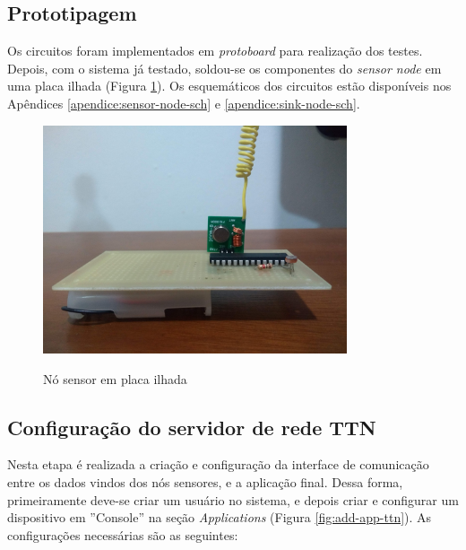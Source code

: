 \documentclass[oneside,openright,12pt]{ufsm_2015} %
\begin{document}
    \subsection{Prototipagem}
    Os circuitos foram implementados em \textit{protoboard} para realização dos testes. Depois, com o sistema já testado, soldou-se os componentes do \textit{sensor node } em uma placa ilhada (Figura \ref{fig:sensor-node-pcb}). Os esquemáticos dos circuitos estão disponíveis nos Apêndices \ref{apendice:sensor-node-sch} e \ref{apendice:sink-node-sch}.
    
    \begin{figure}[ht]
 	    \caption{\label{exepretex} Nó sensor em placa ilhada}
        \centering
        \includegraphics[width=0.8\textwidth]{figuras/sensor-node-pcb.jpg}
        \vspace{\baselineskip} %
        \label{fig:sensor-node-pcb}
    \end{figure}
    
    \subsection{Configuração do servidor de rede TTN}
    Nesta etapa é realizada a criação e configuração da interface de comunicação entre os dados vindos dos nós sensores, e a aplicação final. Dessa forma, primeiramente deve-se criar um usuário no sistema, e depois criar e configurar um dispositivo em ''Console'' na seção \textit{Applications} (Figura \ref{fig:add-app-ttn}). As configurações necessárias são as seguintes: 
    
\end{document}
